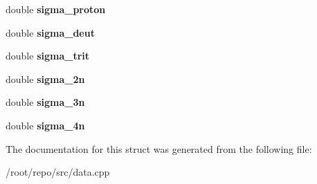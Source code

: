 \begin{DoxyCompactItemize}
double {\bfseries sigma\+\_\+proton}
\item 
\mbox{\label{structsimple__xs_a144a201fa75999fe72b1e7ff6cf599de}} 
double {\bfseries sigma\+\_\+deut}
\item 
\mbox{\label{structsimple__xs_ac94cd1b3c4d07c830484563268c9e3b4}} 
double {\bfseries sigma\+\_\+trit}
\item 
\mbox{\label{structsimple__xs_a48428459c08bd8e7ca73ede3d5d1b12d}} 
double {\bfseries sigma\+\_\+2n}
\item 
\mbox{\label{structsimple__xs_a2d20b02fe8098c55466d12de065bfdee}} 
double {\bfseries sigma\+\_\+3n}
\item 
\mbox{\label{structsimple__xs_a1c2a32a82a8f3e381d67b778c89c499e}} 
double {\bfseries sigma\+\_\+4n}
\end{DoxyCompactItemize}


The documentation for this struct was generated from the following file\+:\begin{DoxyCompactItemize}
\item 
/root/repo/src/data.\+cpp\end{DoxyCompactItemize}
